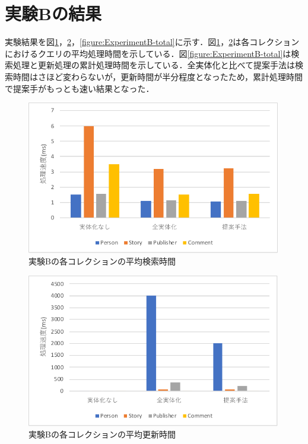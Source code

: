 \documentclass[a4paper,11pt]{ujreport}
\begin{document}
\section{実験Bの結果}
実験結果を図\ref{figure:ExperimentB-find}，\ref{figure:ExperimentB-update}，\ref{figure:ExperimentB-total}に示す．図\ref{figure:ExperimentB-find}，\ref{figure:ExperimentB-update}は各コレクションにおけるクエリの平均処理時間を示している．図\ref{figure:ExperimentB-total}は検索処理と更新処理の累計処理時間を示している．全実体化と比べて提案手法は検索時間はさほど変わらないが，更新時間が半分程度となったため，累計処理時間で提案手がもっとも速い結果となった．
\begin{figure}[htbp]
	\begin{center}
		\includegraphics[width=30em]{src/ExperimentB-find.pdf} %
	\end{center}
	\caption{実験Bの各コレクションの平均検索時間}
	\label{figure:ExperimentB-find}
\end{figure}
\begin{figure}[htbp]
	\begin{center}
		\includegraphics[width=30em]{src/ExperimentB-update.pdf} %
	\end{center}
	\caption{実験Bの各コレクションの平均更新時間}
	\label{figure:ExperimentB-update}
\end{figure}
\end{document}
